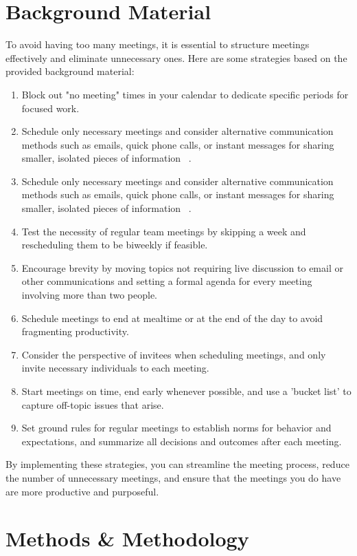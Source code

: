 \documentclass[runningheads]{llncs}
\begin{document}
\section{Background Material}
To avoid having too many meetings, it is essential to structure meetings effectively and eliminate unnecessary ones. Here are some strategies based on the provided background material:
\begin{enumerate}
 \item Block out "no meeting" times in your calendar to dedicate specific periods for focused work.
 \item Schedule only necessary meetings and consider alternative communication methods such as emails, quick phone calls, or instant messages for sharing smaller, isolated pieces of information ~\cite{06}.
 \item Schedule only necessary meetings and consider alternative communication methods such as emails, quick phone calls, or instant messages for sharing smaller, isolated pieces of information ~\cite{06}.
 \item Test the necessity of regular team meetings by skipping a week and rescheduling them to be biweekly if feasible.
 \item Encourage brevity by moving topics not requiring live discussion to email or other communications and setting a formal agenda for every meeting involving more than two people.
 \item Schedule meetings to end at mealtime or at the end of the day to avoid fragmenting productivity.
 \item Consider the perspective of invitees when scheduling meetings, and only invite necessary individuals to each meeting.
 \item Start meetings on time, end early whenever possible, and use a 'bucket list' to capture off-topic issues that arise.
 \item Set ground rules for regular meetings to establish norms for behavior and expectations, and summarize all decisions and outcomes after each meeting.
\end{enumerate}
By implementing these strategies, you can streamline the meeting process, reduce the number of unnecessary meetings, and ensure that the meetings you do have are more productive and purposeful.
\section{Methods \& Methodology}
\end{document}
